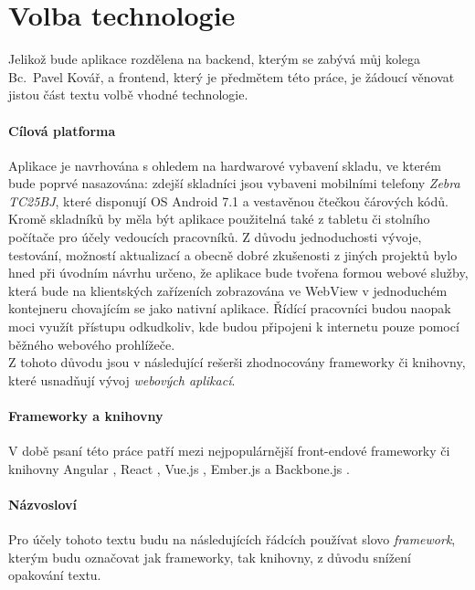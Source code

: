\section{Volba technologie}\label{technology}

Jelikož bude aplikace rozdělena na backend, kterým se zabývá můj kolega Bc.~Pavel Kovář, a frontend, který je předmětem této práce, je žádoucí věnovat jistou část textu volbě vhodné technologie.

\paragraph{Cílová platforma} Aplikace je navrhována s ohledem na hardwarové vybavení skladu, ve kterém bude poprvé nasazována: zdejší skladníci jsou vybaveni mobilními telefony \emph{Zebra TC25BJ}, které disponují OS Android 7.1 a vestavěnou čtečkou čárových kódů. Kromě skladníků by měla být aplikace použitelná také z tabletu či stolního počítače pro účely vedoucích pracovníků. Z důvodu jednoduchosti vývoje,  testování, možností aktualizací a obecně dobré zkušenosti z jiných projektů bylo hned při úvodním návrhu určeno, že aplikace bude tvořena formou webové služby, která bude na klientských zařízeních zobrazována ve WebView v jednoduchém kontejneru chovajícím se jako nativní aplikace. Řídící pracovníci budou naopak moci využít přístupu odkudkoliv, kde budou připojeni k internetu pouze pomocí běžného webového prohlížeče.\\
Z tohoto důvodu jsou v následující rešerši zhodnocovány frameworky či knihovny, které usnadňují vývoj \emph{webových aplikací}.

\paragraph{Frameworky a knihovny} V době psaní této práce patří mezi nejpopulárnější \cite{frameworks-github} \cite{frameworks-hackr} front-endové frameworky či knihovny Angular \cite{angular}, React \cite{react}, Vue.js \cite{vue}, Ember.js \cite{ember} a Backbone.js \cite{backbone}.

\paragraph{Názvosloví} Pro účely tohoto textu budu na následujících řádcích používat slovo \emph{framework}, kterým budu označovat jak frameworky, tak knihovny, z důvodu snížení opakování textu.\\


